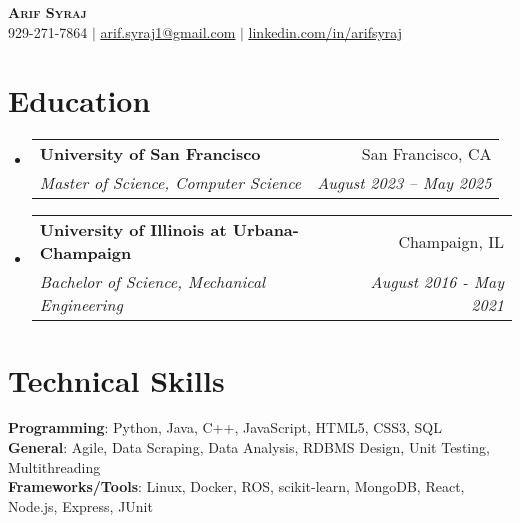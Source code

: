 \documentclass[letterpaper,11pt]{article}
\makeatletter
\newcommand{\resumeSubheading}[4]{
  \vspace{-2pt}\item
    \begin{tabular*}{0.97\textwidth}[t]{l@{\extracolsep{\fill}}r}
      \textbf{#1} & #2 \\
      \textit{\small#3} & \textit{\small #4} \\
    \end{tabular*}\vspace{-7pt}
}
\newcommand{\resumeSubHeadingListStart}
{\begin{itemize}[leftmargin=0.15in, label={}]}
\newcommand{\resumeSubHeadingListEnd}{\end{itemize}}
\makeatother
\begin{document}

\begin{center}
  \textbf{\Huge \scshape Arif Syraj} \\ \vspace{1pt}
  \small 929-271-7864 $|$ \href{mailto:arif.syraj1@gmail.com}{\underline{arif.syraj1@gmail.com}} $|$
  \href{https://linkedin.com/in/...}{\underline{linkedin.com/in/arifsyraj}} %
\end{center}


\section{Education}
\resumeSubHeadingListStart
\resumeSubheading
{University of San Francisco}{San Francisco, CA}
{Master of Science, Computer Science}{August 2023 -- May 2025}

\resumeSubheading
{University of Illinois at Urbana-Champaign}{Champaign, IL}
{Bachelor of Science, Mechanical Engineering}{August 2016 - May 2021}

\resumeSubHeadingListEnd



\section{Technical Skills}
\begin{itemize}[leftmargin=0.15in, label={}]
  \small{\item{
        \textbf{Programming}{: Python, Java, C++, JavaScript, HTML5, CSS3, SQL} \\
        \textbf{General}{: Agile, Data Scraping, Data Analysis, RDBMS Design, Unit Testing, Multithreading} \\
        \textbf{Frameworks/Tools}{: Linux, Docker, ROS, scikit-learn, MongoDB, React, Node.js, Express, JUnit}
        }}
\end{itemize}
\end{document}
